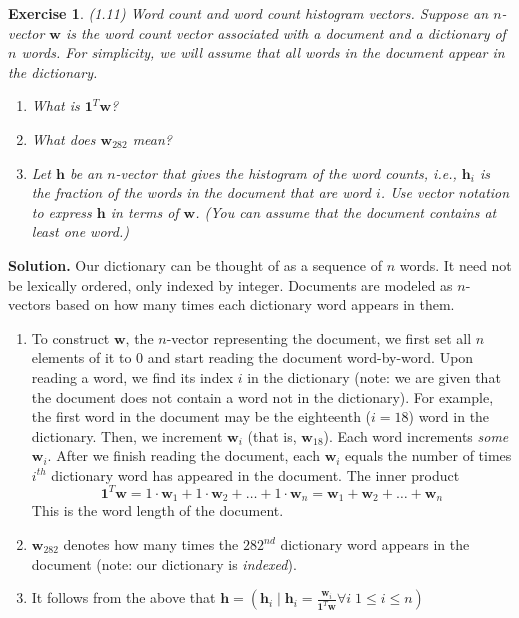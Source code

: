 \documentclass[11pt]{book}
\theoremstyle{definition}
\theoremstyle{plain}
\newtheorem{exercise}{Exercise}[chapter]
\theoremstyle{problemstyle}
\theoremstyle{remark}
\theoremstyle{definition}
\begin{document}
\begin{exercise}
    (1.11) Word count and word count histogram vectors. Suppose an $n$-vector $\boldsymbol{w}$ is the word count vector associated with a document and a dictionary of $n$ words. For simplicity, we will assume that all words in the document appear in the dictionary.
    \begin{enumerate}[label=(\alph*)]
\item What is $\boldsymbol{1}^T\boldsymbol{w}$?
\item What does $\boldsymbol{w}_{\scriptscriptstyle 282}$ mean?
\item Let $\boldsymbol{h}$ be an $n$-vector that gives the histogram of the word counts, i.e., $\boldsymbol{h}_i$ is the fraction of the words in the document that are word $i$. Use vector notation to express $\boldsymbol{h}$ in terms of $\boldsymbol{w}$. (You can assume that the document contains at least one word.)
    \end{enumerate}
\end{exercise}
\textbf{Solution.}
Our dictionary can be thought of as a sequence of $n$ words. It need not be lexically ordered, only indexed by integer. Documents are modeled as $n$-vectors based on how many times each dictionary word appears in them.
\begin{enumerate}[label=(\alph*)]
    \item To construct $\boldsymbol{w}$, the $n$-vector representing the document, we first set all $n$ elements of it to $0$ and start reading the document word-by-word. Upon reading a word, we find its index $i$ in the dictionary (note: we are given that the document does not contain a word not in the dictionary). For example, the first word in the document may be the eighteenth ($i=18$) word in the dictionary. Then, we increment $\boldsymbol{w}_{\scriptscriptstyle i}$ (that is, $\boldsymbol{w}_{\scriptscriptstyle 18}$). Each word increments \emph{some} $\boldsymbol{w}_i$. After we finish reading the document, each $\boldsymbol{w}_i$ equals the number of times $i^{th}$ dictionary word has appeared in the document.
        The inner product
        \[
            \boldsymbol{1}^T\boldsymbol{w}=1\cdot\boldsymbol{w}_1+1\cdot\boldsymbol{w}_2+\dots+1\cdot\boldsymbol{w}_n=\boldsymbol{w}_1+\boldsymbol{w}_2+\dots+\boldsymbol{w}_n
        \]
        This is the word length of the document.

    \item $\boldsymbol{w}_{\scriptscriptstyle 282}$ denotes how many times the $282^{nd}$ dictionary word appears in the document (note: our dictionary is \emph{indexed}).
    \item It follows from the above that $\boldsymbol{h}=(\boldsymbol{h}_i\mid\boldsymbol{h}_i=\frac{\boldsymbol{w}_i}{\boldsymbol{1}^T\boldsymbol{w}}\forall i\;1\leq i\leq n)$
\end{enumerate}
\end{document}
